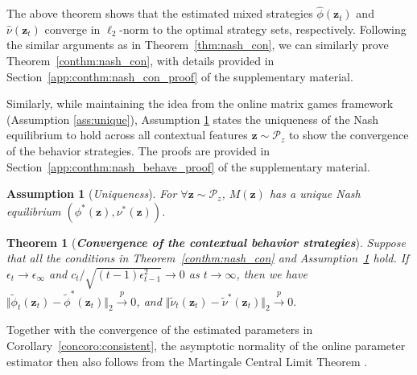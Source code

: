 \documentclass[12pt]{article}
\newtheorem{theorem}{Theorem}
\newtheorem{assumption}{Assumption}[section]
\begin{document}
The above theorem shows that the estimated mixed strategies $\widehat{\phi}(\bm{z}_t)$ and $\widehat{\nu}(\bm{z}_t)$ converge in $\ell_2$-norm to the optimal strategy sets, respectively. Following the similar arguments as in Theorem~\ref{thm:nash_con}, we can similarly prove Theorem~\ref{conthm:nash_con}, with details provided in Section~\ref{app:conthm:nash_con_proof} of the supplementary material. 


Similarly, while maintaining the idea from the online matrix games framework (Assumption \ref{ass:unique}), Assumption \ref{conass:unique} states the uniqueness of the Nash equilibrium to hold across all contextual features $\bm{z}\sim\mathcal{P}_z$ to show the convergence of the behavior strategies. The proofs are provided in Section~\ref{app:conthm:nash_behave_proof} of the supplementary material.

\begin{assumption}[\emph{Uniqueness}]
\label{conass:unique}
    For $\forall \bm{z} \sim \mathcal{P}_z$, $M(\bm{z})$ has a unique Nash equilibrium $(\phi^\ast(\bm{z}),\nu^\ast(\bm{z}))$.
\end{assumption}

\begin{theorem}[\textbf{\emph{Convergence of the contextual behavior strategies}}]
\label{conthm:behave_con}
Suppose that all the conditions in Theorem~\ref{conthm:nash_con} and
Assumption~\ref{conass:unique} hold. If $\epsilon_t\to\epsilon_\infty$ and $c_t/\sqrt{(t-1)\epsilon_{t-1}^2} \to 0$ as $t \to \infty$, then we have 
$\Vert \widetilde{\phi}_t(\bm z_t) - \widetilde{\phi}^{\ast}(\bm z_t) \Vert_2 \stackrel{p}{\to} 0$, and
$\Vert \widetilde{\nu}_t(\bm z_t) - \widetilde{\nu}^{\ast}(\bm z_t) \Vert_2 \stackrel{p}{\to} 0.$
\end{theorem}
Together with the convergence of the estimated parameters in Corollary~\ref{concoro:consistent}, the asymptotic normality of the online parameter estimator then also follows from the Martingale Central Limit Theorem \citep{hall1980martingale}.
\end{document}
